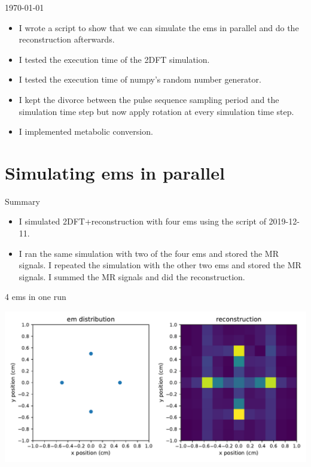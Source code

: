 \documentclass[dvipsnames]{beamer}
\begin{document}
\begin{frame}{\today}
\begin{itemize}
\item I wrote a script to show that we can simulate the ems in parallel and do the reconstruction afterwards.
\item I tested the execution time of the 2DFT simulation.
\item I tested the execution time of numpy's random number generator.
\item I kept the divorce between the pulse sequence sampling period and the simulation time step but now apply rotation at every simulation time step.
\item I implemented metabolic conversion.
\end{itemize}
\end{frame}

\section{Simulating ems in parallel}

\begin{frame}{Summary}
\begin{itemize}
\item I simulated 2DFT+reconstruction with four ems using the script of 2019-12-11.
\item I ran the same simulation with two of the four ems and stored the MR signals. I repeated the simulation with the other two ems and stored the MR signals. I summed the MR signals and did the reconstruction.
\end{itemize}
\end{frame}

\begin{frame}{4 ems in one run}
\begin{center}
\includegraphics[width=\textwidth]{reconstruction_single}
\end{center}
\end{frame}
\end{document}
